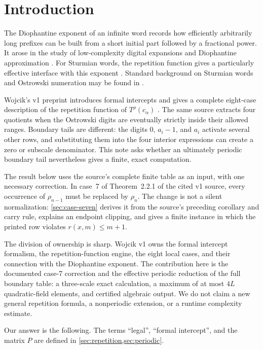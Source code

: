 \section{Introduction}
\label{sec:introduction}

The Diophantine exponent of an infinite word records how efficiently
arbitrarily long prefixes can be built from a short initial part followed by a
fractional power.  It arose in the study of low-complexity digital expansions
and Diophantine approximation \cite{AdamczewskiBugeaud2007}.  For Sturmian
words, the repetition function gives a particularly effective interface with
this exponent \cite{BugeaudKim2019}.  Standard background on Sturmian words and
Ostrowski numeration may be found in \cite{Lothaire2002,AlloucheShallit2003}.

Wojcik's v1 preprint introduces formal intercepts and gives a complete
eight-case description of the repetition function of
$T^\rho(c_\alpha)$ \cite{Wojcik2025v1}.  The same source extracts four
quotients when the Ostrowski digits are eventually strictly inside their
allowed ranges.  Boundary tails are different: the digits $0$, $a_i-1$, and
$a_i$ activate several other rows, and substituting them into the four
interior expressions can create a zero or subscale denominator.  This note
asks whether an ultimately periodic boundary tail nevertheless gives a finite,
exact computation.

The result below uses the source's complete finite table as an input, with one
necessary correction.  In case~7 of Theorem~2.2.1 of the cited v1 source,
every occurrence of $\rho_{n-1}$ must be replaced by $\rho_n$.  The change is
not a silent normalization: \cref{sec:case-seven} derives it from the source's
preceding corollary and carry rule, explains an endpoint clipping, and gives a
finite instance in which the printed row violates $r(x,m)\leq m+1$.

The division of ownership is sharp.  Wojcik v1 owns the formal intercept
formalism, the repetition-function engine, the eight local cases, and their
connection with the Diophantine exponent.  The contribution here is the
documented case-7 correction and the effective periodic reduction of the full
boundary table: a three-scale exact calculation, a maximum of at most $4L$
quadratic-field elements, and certified algebraic output.  We do not claim a
new general repetition formula, a nonperiodic extension, or a runtime
complexity estimate.

Our answer is the following.  The terms ``legal'', ``formal intercept'', and
the matrix $P$ are defined in \cref{sec:repetition,sec:periodic}.

